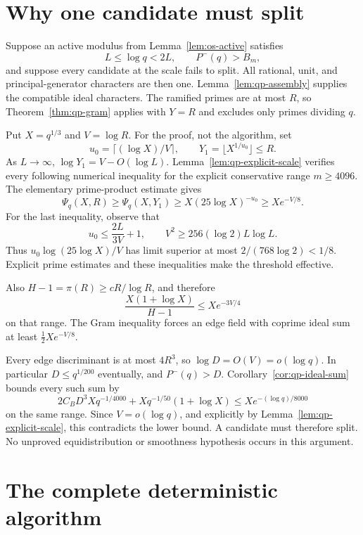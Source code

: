 \section{Why one candidate must split}
\label{sec:os-contradiction}

Suppose an active modulus from Lemma~\ref{lem:os-active} satisfies
\[
 L\leq\log q<2L,\qquad P^-(q)>B_m,
\]
and suppose every candidate at the scale fails to split.
All rational, unit, and principal-generator characters are then one.
Lemma~\ref{lem:qp-assembly} supplies the compatible ideal characters.
The ramified primes are at most $R$, so
Theorem~\ref{thm:qp-gram} applies with $Y=R$ and excludes only primes
dividing $q$.

Put $X=q^{1/3}$ and $V=\log R$.  For the proof, not the algorithm,
set
\[
 u_0=\lceil(\log X)/V\rceil,
 \qquad Y_1=\lfloor X^{1/u_0}\rfloor\leq R.
\]
As $L\longrightarrow\infty$, $\log Y_1=V-O(\log L)$.
Lemma~\ref{lem:qp-explicit-scale} verifies every following numerical
inequality for the explicit conservative range $m\geq4096$.
The elementary prime-product estimate gives
\begin{equation}
 \Psi_q(X,R)\geq\Psi_q(X,Y_1)
       \geq X(25\log X)^{-u_0}\geq Xe^{-V/8}.
 \label{eq:os-smooth-lower}
\end{equation}
For the last inequality, observe that
\[
 u_0\leq\frac{2L}{3V}+1,
 \qquad V^2\geq256(\log2)L\log L.
\]
Thus $u_0\log(25\log X)/V$ has limit superior at most
$2/(768\log2)<1/8$.  Explicit prime estimates and these inequalities
make the threshold effective.

Also $H-1=\pi(R)\geq cR/\log R$, and therefore
\begin{equation}
 \frac{X(1+\log X)}{H-1}\leq Xe^{-3V/4}
 \label{eq:os-diagonal}
\end{equation}
on that range.  The Gram inequality forces an
edge field with coprime ideal sum at least $\frac12Xe^{-V/8}$.

Every edge discriminant is at most $4R^3$, so
$\log D=O(V)=o(\log q)$.  In particular $D\leq q^{1/200}$ eventually,
and $P^-(q)>D$.  Corollary~\ref{cor:qp-ideal-sum} bounds every such
sum by
\[
 2C_BD^3Xq^{-1/4000}+Xq^{-1/50}(1+\log X)
 \leq Xe^{-(\log q)/8000}
\]
on the same range.  Since $V=o(\log q)$, and explicitly by
Lemma~\ref{lem:qp-explicit-scale}, this
contradicts the lower bound.  A candidate must therefore split.
No unproved equidistribution or smoothness hypothesis occurs in this
argument.

\section{The complete deterministic algorithm}

